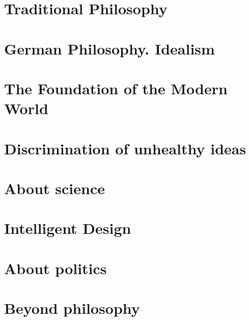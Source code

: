 \documentclass[a4paper,12pt,twoside]{book}
\begin{document}
\chapter{Traditional Philosophy}




\chapter{German Philosophy. Idealism}




\chapter{The Foundation of the Modern World}




\chapter{Discrimination of unhealthy ideas}



%





\chapter{About science}







\chapter{Intelligent Design}






\chapter{About politics}


\chapter{Beyond philosophy}

\end{document}
